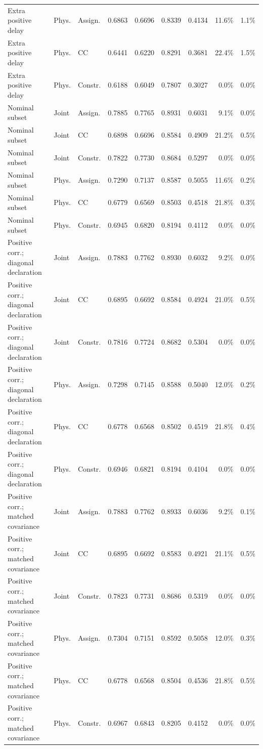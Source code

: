 \begin{longtable}{@{}p{3.8cm}llrrrrrr@{}}
Extra positive delay & Phys. & Assign. & 0.6863 & 0.6696 & 0.8339 & 0.4134 & 11.6\% & 1.1\% \\
Extra positive delay & Phys. & CC & 0.6441 & 0.6220 & 0.8291 & 0.3681 & 22.4\% & 1.5\% \\
Extra positive delay & Phys. & Constr. & 0.6188 & 0.6049 & 0.7807 & 0.3027 & 0.0\% & 0.0\% \\
Nominal subset & Joint & Assign. & 0.7885 & 0.7765 & 0.8931 & 0.6031 & 9.1\% & 0.0\% \\
Nominal subset & Joint & CC & 0.6898 & 0.6696 & 0.8584 & 0.4909 & 21.2\% & 0.5\% \\
Nominal subset & Joint & Constr. & 0.7822 & 0.7730 & 0.8684 & 0.5297 & 0.0\% & 0.0\% \\
Nominal subset & Phys. & Assign. & 0.7290 & 0.7137 & 0.8587 & 0.5055 & 11.6\% & 0.2\% \\
Nominal subset & Phys. & CC & 0.6779 & 0.6569 & 0.8503 & 0.4518 & 21.8\% & 0.3\% \\
Nominal subset & Phys. & Constr. & 0.6945 & 0.6820 & 0.8194 & 0.4112 & 0.0\% & 0.0\% \\
Positive corr.; diagonal declaration & Joint & Assign. & 0.7883 & 0.7762 & 0.8930 & 0.6032 & 9.2\% & 0.0\% \\
Positive corr.; diagonal declaration & Joint & CC & 0.6895 & 0.6692 & 0.8584 & 0.4924 & 21.0\% & 0.5\% \\
Positive corr.; diagonal declaration & Joint & Constr. & 0.7816 & 0.7724 & 0.8682 & 0.5304 & 0.0\% & 0.0\% \\
Positive corr.; diagonal declaration & Phys. & Assign. & 0.7298 & 0.7145 & 0.8588 & 0.5040 & 12.0\% & 0.2\% \\
Positive corr.; diagonal declaration & Phys. & CC & 0.6778 & 0.6568 & 0.8502 & 0.4519 & 21.8\% & 0.4\% \\
Positive corr.; diagonal declaration & Phys. & Constr. & 0.6946 & 0.6821 & 0.8194 & 0.4104 & 0.0\% & 0.0\% \\
Positive corr.; matched covariance & Joint & Assign. & 0.7883 & 0.7762 & 0.8933 & 0.6036 & 9.2\% & 0.1\% \\
Positive corr.; matched covariance & Joint & CC & 0.6895 & 0.6692 & 0.8583 & 0.4921 & 21.1\% & 0.5\% \\
Positive corr.; matched covariance & Joint & Constr. & 0.7823 & 0.7731 & 0.8686 & 0.5319 & 0.0\% & 0.0\% \\
Positive corr.; matched covariance & Phys. & Assign. & 0.7304 & 0.7151 & 0.8592 & 0.5058 & 12.0\% & 0.3\% \\
Positive corr.; matched covariance & Phys. & CC & 0.6778 & 0.6568 & 0.8504 & 0.4536 & 21.8\% & 0.5\% \\
Positive corr.; matched covariance & Phys. & Constr. & 0.6967 & 0.6843 & 0.8205 & 0.4152 & 0.0\% & 0.0\% \\
\end{longtable}
\normalsize

